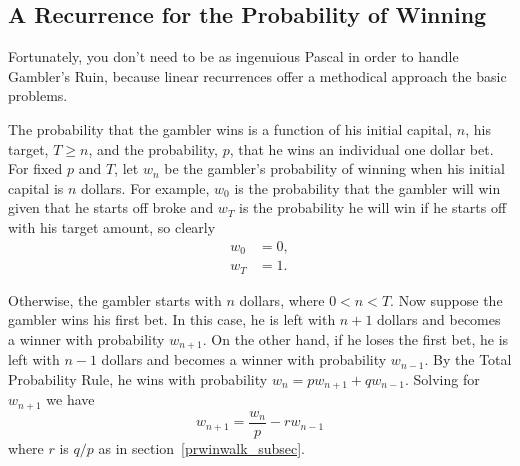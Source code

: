 \subsection{A Recurrence for the Probability of Winning}

Fortunately, you don't need to be as ingenuious Pascal in order to
handle Gambler's Ruin, because linear recurrences offer a methodical
approach the basic problems.

The probability that the gambler wins is a function of his initial
capital, $n$, his target, $T \geq n$, and the probability, $p$, that
he wins an individual one dollar bet.  For fixed $p$ and $T$, let
$w_n$ be the gambler's probability of winning when his initial
capital is $n$ dollars.  For example, $w_0$ is the probability that
the gambler will win given that he starts off broke and $w_T$ is the
probability he will win if he starts off with his target amount, so
clearly
\begin{align}
w_0 & = 0,\label{LN12:w0}\\
w_T & = 1. \label{LN12:wT}
\end{align}

Otherwise, the gambler starts with $n$ dollars, where $0 < n < T$.
Now suppose the gambler wins his first bet.  In this case, he is left
with $n+1$ dollars and becomes a winner with probability $w_{n+1}$.
On the other hand, if he loses the first bet, he is left with $n-1$
dollars and becomes a winner with probability $w_{n-1}$.  By the Total
Probability Rule, he wins with probability $w_n = p w_{n+1} + q
w_{n-1}$.  Solving for $w_{n+1}$ we have
\begin{equation}\label{LN12:rec1}
w_{n+1} = \frac{w_n}{p} - r w_{n-1}
\end{equation}
where $r$ is $q/p$ as in section~\ref{prwinwalk_subsec}.

